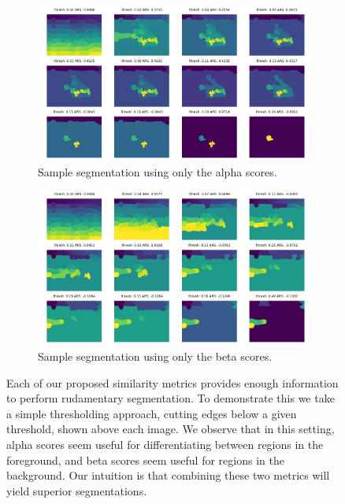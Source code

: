 \documentclass[twocolumn]{article}
\newcommand{\figlab}[1]{\label{fig:#1}}
\begin{document}
\begin{figure}[t]
  \centering

  \begin{subfigure}{0.49\linewidth}
    \includegraphics[width=\linewidth]{figs/only_alpha.png}
    \caption{Sample segmentation using only the alpha scores.}
  \end{subfigure}
  \begin{subfigure}{0.49\linewidth}
    \includegraphics[width=\linewidth]{figs/only_beta.png}
    \caption{Sample segmentation using only the beta scores.}
  \end{subfigure}

  \caption{
    Each of our proposed similarity metrics provides enough information to
    perform rudamentary segmentation. To demonstrate this we take a simple
    thresholding approach, cutting edges below a given threshold, shown above
    each image. 
    We observe that in this setting, alpha scores seem useful for
    differentiating between regions in the foreground, and beta scores seem
    useful for regions in the background. Our intuition is that combining these
    two metrics will yield superior segmentations.
  }
  \figlab{ab_only}
\end{figure}
\end{document}
